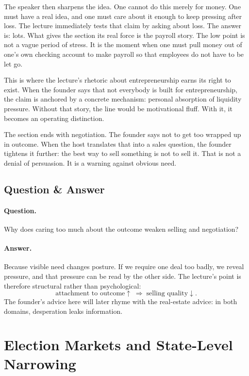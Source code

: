 The speaker then sharpens the idea. One cannot do this merely for money. One must have a real idea, and one must care about it enough to keep pressing after loss. The lecture immediately tests that claim by asking about loss. The answer is: lots. What gives the section its real force is the payroll story. The low point is not a vague period of stress. It is the moment when one must pull money out of one's own checking account to make payroll so that employees do not have to be let go.

This is where the lecture's rhetoric about entrepreneurship earns its right to exist. When the founder says that not everybody is built for entrepreneurship, the claim is anchored by a concrete mechanism: personal absorption of liquidity pressure. Without that story, the line would be motivational fluff. With it, it becomes an operating distinction.

The section ends with negotiation. The founder says not to get too wrapped up in outcome. When the host translates that into a sales question, the founder tightens it further: the best way to sell something is not to sell it. That is not a denial of persuasion. It is a warning against obvious need.

\subsection{Question \& Answer}

\paragraph{Question.} Why does caring too much about the outcome weaken selling and negotiation?

\paragraph{Answer.} Because visible need changes posture. If we require one deal too badly, we reveal pressure, and that pressure can be read by the other side. The lecture's point is therefore structural rather than psychological:
\begin{equation}
\text{attachment to outcome}\uparrow \;\Rightarrow\; \text{selling quality}\downarrow.
\end{equation}
The founder's advice here will later rhyme with the real-estate advice: in both domains, desperation leaks information.

\section{Election Markets and State-Level Narrowing}


